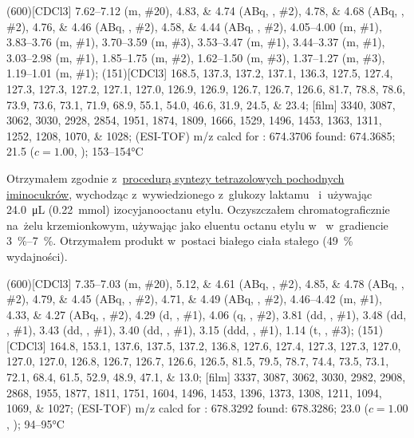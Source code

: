 \begin{fullexp}
	\NMR(600)[CDCl3] \numrange{7.62}{7.12} (m, \#{20}), \numlist{4.83;4.74} (ABq, , \#{2}), \numlist{4.78;4.68} (ABq, , \#{2}), \numlist{4.76;4.46} (ABq, , \#{2}), \numlist{4.58;4.44} (ABq, , \#{2}), \numrange{4.05}{4.00} (m, \#{1}), \numrange{3.83}{3.76} (m, \#{1}), \numrange{3.70}{3.59} (m, \#{3}), \numrange{3.53}{3.47} (m, \#{1}), \numrange{3.44}{3.37} (m, \#{1}), \numrange{3.03}{2.98} (m, \#{1}), \numrange{1.85}{1.75} (m, \#{2}), \numrange{1.62}{1.50} (m, \#{3}), \numrange{1.37}{1.27} (m, \#{3}), \numrange{1.19}{1.01} (m, \#{1});
	(151)[CDCl3] \numlist{168.5; 137.3; 137.2; 137.1; 136.3; 127.5; 127.4; 127.3; 127.3; 127.2; 127.1; 127.0; 126.9; 126.9; 126.7; 126.7; 126.6; 81.7; 78.8; 78.6; 73.9; 73.6; 73.1; 71.9; 68.9; 55.1; 54.0; 46.6; 31.9; 24.5; 23.4};
	[film] \numlist{3340; 3087; 3062; 3030; 2928; 2854; 1951; 1874; 1809; 1666; 1529; 1496; 1453; 1363; 1311; 1252; 1208; 1070; 1028};
	 (ESI-TOF) m/z calcd for : \num{674.3706} found: \num{674.3685};
	\data{[$\alpha^{23}_D$]~$=$} \num{21.5} ($c = 1.00$, );
	 \numrange{153}{154}\si{\celsius}
\end{fullexp}

Otrzymałem zgodnie z~\hyperref[experimental:sugars:schwartz]{procedurą syntezy tetrazolowych
	pochodnych iminocukrów}, wychodząc z~wywiedzionego z~glukozy laktamu~
	i~używając \SI{24.0}{\micro\liter} (\SI{0.22}{\milli\mol}) izocyjanooctanu etylu.
Oczyszczałem chromatograficznie na~żelu krzemionkowym,
	używając jako eluentu octanu etylu w~ w~gradiencie \SIrange{3}{7}{\percent}.
Otrzymałem produkt w~postaci białego ciała stałego (\SI{49}{\percent} wydajności).

\begin{fullexp}
	\NMR(600)[CDCl3] \numrange{7.35}{7.03} (m, \#{20}), \numlist{5.12;4.61} (ABq, , \#{2}), \numlist{4.85;4.78} (ABq, , \#{2}), \numlist{4.79;4.45} (ABq, , \#{2}), \numlist{4.71;4.49} (ABq, , \#{2}), \numrange{4.46}{4.42} (m, \#{1}), \numlist{4.33;4.27} (ABq, , \#{2}), \num{4.29} (d, , \#{1}), \num{4.06} (q, , \#{2}), \num{3.81} (dd, , \#{1}), \num{3.48} (dd, , \#{1}), \num{3.43} (dd, , \#{1}), \num{3.40} (dd, , \#{1}), \num{3.15} (ddd, , \#{1}), \num{1.14} (t, , \#{3});
	(151)[CDCl3] \numlist{164.8; 153.1; 137.6; 137.5; 137.2; 136.8; 127.6; 127.4; 127.3; 127.3; 127.0; 127.0; 127.0; 126.8; 126.7; 126.7; 126.6; 126.5; 81.5; 79.5; 78.7; 74.4; 73.5; 73.1; 72.1; 68.4; 61.5; 52.9; 48.9; 47.1; 13.0};
	[film] \numlist{3337; 3087; 3062; 3030; 2982; 2908; 2868; 1955; 1877; 1811; 1751; 1604; 1496; 1453; 1396; 1373; 1308; 1211; 1094; 1069; 1027};
	 (ESI-TOF) m/z calcd for : \num{678.3292} found: \num{678.3286};
	\data{[$\alpha^{23}_D$]~$=$} \num{23.0} ($c = 1.00$, );
	 \numrange{94}{95}\si{\celsius}
\end{fullexp}

